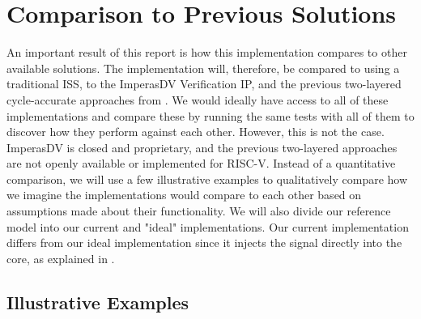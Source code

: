 %
%
%
%


\section{Comparison to Previous Solutions}
\label{sec:res_comparison}

An important result of this report is how this implementation compares to other available solutions. The implementation will, therefore, be compared to using a traditional ISS, to the ImperasDV Verification IP, and the previous two-layered cycle-accurate approaches from . We would ideally have access to all of these implementations and compare these by running the same tests with all of them to discover how they perform against each other. However, this is not the case. ImperasDV is closed and proprietary, and the previous two-layered approaches are not openly available or implemented for RISC-V. Instead of a quantitative comparison, we will use a few illustrative examples to qualitatively compare how we imagine the implementations would compare to each other based on assumptions made about their functionality.  We will also divide our reference model into our current and "ideal" implementations. Our current implementation differs from our ideal implementation since it injects the  signal directly into the core, as explained in .

\subsection{Illustrative Examples}

